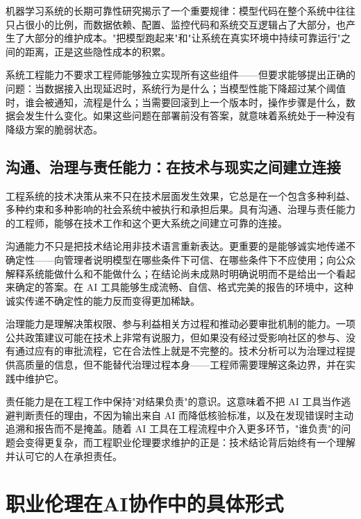 机器学习系统的长期可靠性研究揭示了一个重要规律：模型代码在整个系统中往往只占很小的比例，而数据依赖、配置、监控代码和系统交互逻辑占了大部分，也产生了大部分的维护成本\cite{sculley2015hidden}。"把模型跑起来"和"让系统在真实环境中持续可靠运行"之间的距离，正是这些隐性成本的积累。

系统工程能力不要求工程师能够独立实现所有这些组件——但要求能够提出正确的问题：当数据接入出现延迟时，系统行为是什么；当模型性能下降超过某个阈值时，谁会被通知，流程是什么；当需要回滚到上一个版本时，操作步骤是什么，数据会发生什么变化。如果这些问题在部署前没有答案，就意味着系统处于一种没有降级方案的脆弱状态。

\subsection{沟通、治理与责任能力：在技术与现实之间建立连接}

工程系统的技术决策从来不只在技术层面发生效果，它总是在一个包含多种利益、多种约束和多种影响的社会系统中被执行和承担后果。具有沟通、治理与责任能力的工程师，能够在技术工作和这个更大系统之间建立可靠的连接。

沟通能力不只是把技术结论用非技术语言重新表达。更重要的是能够诚实地传递不确定性——向管理者说明模型在哪些条件下可信、在哪些条件下不应使用；向公众解释系统能做什么和不能做什么；在结论尚未成熟时明确说明而不是给出一个看起来确定的答案。在 AI 工具能够生成流畅、自信、格式完美的报告的环境中，这种诚实传递不确定性的能力反而变得更加稀缺。

治理能力是理解决策权限、参与利益相关方过程和推动必要审批机制的能力。一项公共政策建议可能在技术上非常有说服力，但如果没有经过受影响社区的参与、没有通过应有的审批流程，它在合法性上就是不完整的。技术分析可以为治理过程提供高质量的信息，但不能替代治理过程本身——工程师需要理解这条边界，并在实践中维护它。

责任能力是在工程工作中保持"对结果负责"的意识。这意味着不把 AI 工具当作逃避判断责任的理由，不因为输出来自 AI 而降低核验标准，以及在发现错误时主动追溯和报告而不是掩盖。随着 AI 工具在工程流程中介入更多环节，"谁负责"的问题会变得更复杂，而工程职业伦理要求维护的正是：技术结论背后始终有一个理解并认可它的人在承担责任。

\section{职业伦理在AI协作中的具体形式}

